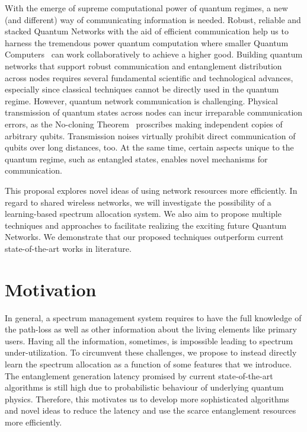 With the emerge of supreme computational power of quantum regimes, a new (and different) way of communicating information is needed. 
Robust, reliable and stacked Quantum Networks with the aid of efficient communication help us to harness the tremendous power quantum computation where smaller Quantum Computers~\cite{google-nature-19,ibm-quantum-roadmap} can work collaboratively to achieve a higher good.
Building quantum networks that support robust communication and entanglement distribution across nodes requires several fundamental scientific and technological advances, especially since classical techniques cannot be directly used in the quantum regime.
However, quantum network communication is challenging. 
Physical transmission of quantum states across nodes can incur irreparable communication errors, as the No-cloning Theorem~\cite{Dieks-nocloning} proscribes making independent copies of arbitrary qubits. 
Transmission noises virtually prohibit direct communication of qubits over long distances, too.
At the same time, certain aspects unique to the quantum regime, such as entangled states, enables 
novel mechanisms for communication.

This proposal explores novel ideas of using network resources more efficiently.
In regard to shared wireless networks, we will investigate the possibility of a learning-based spectrum allocation system.
We also aim to propose multiple techniques and approaches to facilitate realizing the exciting future Quantum Networks.
We demonstrate that our proposed techniques outperform current state-of-the-art works in literature.

\section{Motivation}

In general, a spectrum management system requires to have the full knowledge of the path-loss as well as other information about the living elements like primary users. 
Having all the information, sometimes, is impossible leading to spectrum under-utilization. 
To circumvent these challenges, we propose to instead directly learn the spectrum allocation as a function of some features that we introduce.
The entanglement generation latency promised by current state-of-the-art algorithms is still high due to probabilistic behaviour of underlying quantum physics. Therefore, this motivates us to develop more sophisticated algorithms and novel ideas to reduce the latency and use the scarce entanglement resources more efficiently.


